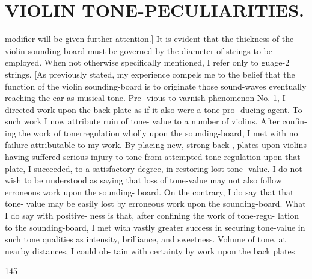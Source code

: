 \documentclass{article}
\begin{document}
\section*{VIOLIN TONE-PECULIARITIES.}
modifier will be given further attention.] It is evident that the thickness of the violin sounding-board must be governed by the diameter of strings to be employed. When not otherwise specifically mentioned, I refer only to guage-2 strings. [As previously stated, my experience compels me to the belief that the function of the violin sounding-board is to originate those sound-waves eventually reaching the ear as musical tone. Pre- vious to varnish phenomenon No. 1, I directed work upon the back plate as if it also were a tone-pro- ducing agent. To such work I now attribute ruin of tone- value to a number of violins. After confin- ing the work of tonerregulation wholly upon the sounding-board, I met with no failure attributable to my work. By placing new, strong back , plates upon violins having suffered serious injury to tone from attempted tone-regulation upon that plate, I succeeded, to a satisfactory degree, in restoring lost tone- value. I do not wish to be understood as saying that loss of tone-value may not also follow erroneous work upon the sounding- board. On the contrary, I do say that that tone- value may be easily lost by erroneous work upon the sounding-board. What I do say with positive- ness is that, after confining the work of tone-regu- lation to the sounding-board, I met with vastly greater success in securing tone-value in such tone qualities as intensity, brilliance, and sweetness. Volume of tone, at nearby distances, I could ob- tain with certainty by work upon the back plates

145
\end{document}
